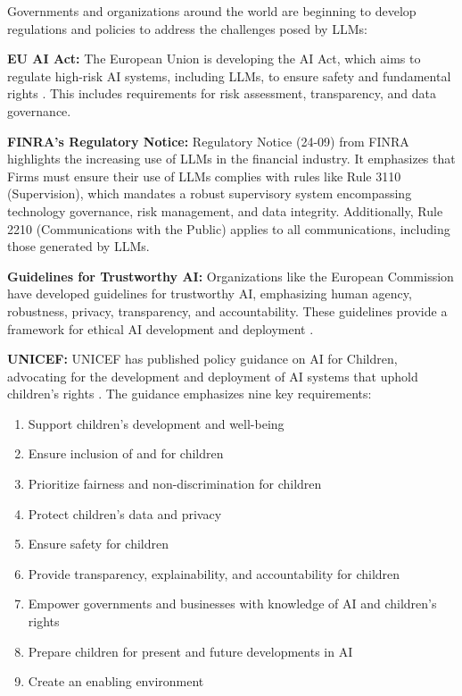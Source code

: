 Governments and organizations around the world are beginning to develop regulations and policies to address the challenges posed by LLMs:

\textbf{EU AI Act:} The European Union is developing the AI Act, which aims to regulate high-risk AI systems, including LLMs, to ensure safety and fundamental rights . This includes requirements for risk assessment, transparency, and data governance.  

\textbf{FINRA's Regulatory Notice:} Regulatory Notice (24-09)  from FINRA highlights the increasing use of LLMs in the financial industry. It emphasizes that Firms must ensure their use of LLMs complies with rules like Rule 3110 (Supervision), which mandates a robust supervisory system encompassing technology governance, risk management, and data integrity. Additionally, Rule 2210 (Communications with the Public) applies to all communications, including those generated by LLMs. 

\textbf{Guidelines for Trustworthy AI:} Organizations like the European Commission have developed guidelines for trustworthy AI, emphasizing human agency, robustness, privacy, transparency, and accountability. These guidelines provide a framework for ethical AI development and deployment .

\textbf{UNICEF:} UNICEF has published policy guidance on AI for Children, advocating for the development and deployment of AI systems that uphold children's rights . The guidance emphasizes nine key requirements:
\begin{enumerate}
    \item Support children's development and well-being
    \item Ensure inclusion of and for children
    \item Prioritize fairness and non-discrimination for children
    \item Protect children's data and privacy
    \item Ensure safety for children
    \item Provide transparency, explainability, and accountability for children
    \item Empower governments and businesses with knowledge of AI and children's rights
    \item Prepare children for present and future developments in AI
    \item Create an enabling environment
\end{enumerate}

